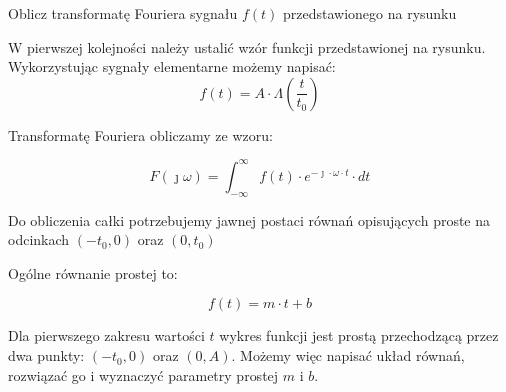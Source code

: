 \begin{task}
Oblicz transformatę Fouriera sygnału $f(t)$ przedstawionego na rysunku

\begin{figure}[H]
\centering
{}
\end{figure}

W pierwszej kolejności należy ustalić wzór funkcji przedstawionej na rysunku.
Wykorzystując sygnały elementarne możemy napisać:
\begin{equation}
f(t) = A \cdot \Lambda(\frac{t}{t_{0}})
\end{equation}

Transformatę Fouriera obliczamy ze wzoru:

\begin{equation}
F(\jmath \omega )=\int_{-\infty }^{\infty}f(t) \cdot e^{-\jmath \cdot \omega \cdot t}\cdot dt
\end{equation}

Do obliczenia całki potrzebujemy jawnej postaci równań opisujących proste na odcinkach $(-t_{0}, 0)$ oraz $(0, t_{0})$ 

Ogólne równanie prostej to:

\begin{equation}
f(t) = m \cdot t + b
\end{equation}

Dla pierwszego zakresu wartości $t$ wykres funkcji jest prostą przechodzącą przez dwa punkty: $(-t_{0},0)$ oraz $(0,A)$. Możemy więc napisać układ równań, rozwiązać go i wyznaczyć parametry prostej $m$ i $b$.  


\end{task}
